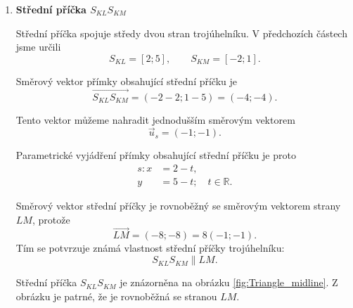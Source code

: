 \begin{example}
\begin{enumerate}[label=\alph*), leftmargin=2em]
\begin{figure}[H]
\begin{tikzpicture}[scale=0.5]
            \end{tikzpicture}
            \caption{Těžnice $t_l$ vedená z vrcholu $L$ do středu $S_{KM}$ protější strany.}
            \label{fig:Triangle_median_tl}
        \end{figure}

        \item \textbf{Střední příčka $S_{KL}S_{KM}$}

        Střední příčka spojuje středy dvou stran trojúhelníku.
        V předchozích částech jsme určili
        \[
            S_{KL}=[2;5],
            \qquad
            S_{KM}=[-2;1].
        \]

        Směrový vektor přímky obsahující střední příčku je
        \[
            \overrightarrow{S_{KL}S_{KM}}
            =
            (-2-2;1-5)
            =
            (-4;-4).
        \]

        Tento vektor můžeme nahradit jednodušším směrovým vektorem
        \[
            \vec{u}_s=(-1;-1).
        \]

        Parametrické vyjádření přímky obsahující střední příčku je
        proto
        \begin{align*}
            s: x &= 2-t,\\
               y &= 5-t;
               \quad t\in\mathbb{R}.
        \end{align*}

        Směrový vektor střední příčky je rovnoběžný se směrovým
        vektorem strany $LM$, protože
        \[
            \overrightarrow{LM}=(-8;-8)
            =
            8(-1;-1).
        \]
        Tím se potvrzuje známá vlastnost střední příčky trojúhelníku:
        \[
            S_{KL}S_{KM}\parallel LM.
        \]

        Střední příčka $S_{KL}S_{KM}$ je znázorněna na obrázku \ref{fig:Triangle_midline}.
        Z obrázku je patrné, že je rovnoběžná se stranou $LM$.

        \begin{figure}[H]
            \centering
\end{figure}
\end{enumerate}
\end{example}

